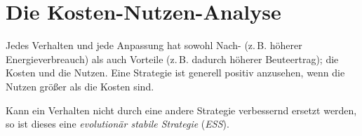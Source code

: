 \documentclass{article}
\begin{document}
\section{Die Kosten-Nutzen-Analyse} 
Jedes Verhalten und jede Anpassung hat sowohl Nach- (z.\,B. höherer Energieverbreauch) als auch Vorteile (z.\,B. dadurch höherer Beuteertrag); die Kosten und die Nutzen. Eine Strategie ist generell positiv anzusehen, wenn die Nutzen größer als die Kosten sind.
 
Kann ein Verhalten nicht durch eine andere Strategie verbessernd ersetzt werden, so ist dieses eine \emph{evolutionär stabile Strategie} (\emph{ESS}).
 
\end{document}
